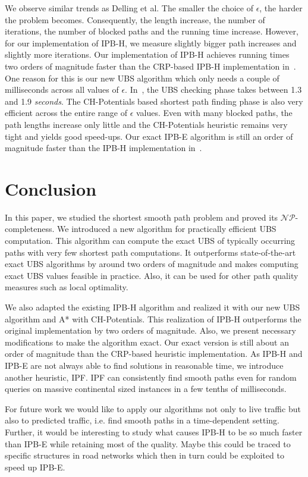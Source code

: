 \documentclass[a4paper,UKenglish,cleveref, autoref, thm-restate]{lipics-v2021}
\begin{document}
We observe similar trends as Delling et al.
The smaller the choice of $\epsilon$, the harder the problem becomes.
Consequently, the length increase, the number of iterations, the number of blocked paths and the running time increase.
However, for our implementation of IPB-H, we measure slightly bigger path increases and slightly more iterations.
Our implementation of IPB-H achieves running times two orders of magnitude faster than the CRP-based IPB-H implementation in~\cite{dss-tarrn-18}.
One reason for this is our new UBS algorithm which only needs a couple of milliseconds across all values of $\epsilon$.
In~\cite{dss-tarrn-18}, the UBS checking phase takes between 1.3 and 1.9 \emph{seconds}.
The CH-Potentials based shortest path finding phase is also very efficient across the entire range of $\epsilon$ values.
Even with many blocked paths, the path lengths increase only little and the CH-Potentials heuristic remains very tight and yields good speed-ups.
Our exact IPB-E algorithm is still an order of magnitude faster than the IPB-H implementation in~\cite{dss-tarrn-18}.

\section{Conclusion}

In this paper, we studied the shortest smooth path problem and proved its $\mathcal{NP}$-completeness.
We introduced a new algorithm for practically efficient UBS computation.
This algorithm can compute the exact UBS of typically occurring paths with very few shortest path computations.
It outperforms state-of-the-art exact UBS algorithms by around two orders of magnitude and makes computing exact UBS values feasible in practice.
Also, it can be used for other path quality measures such as local optimality.

We also adapted the existing IPB-H algorithm and realized it with our new UBS algorithm and A* with CH-Potentials.
This realization of IPB-H outperforms the original implementation by two orders of magnitude.
Also, we present necessary modifications to make the algorithm exact.
Our exact version is still about an order of magnitude than the CRP-based heuristic implementation.
As IPB-H and IPB-E are not always able to find solutions in reasonable time, we introduce another heuristic, IPF.
IPF can consistently find smooth paths even for random queries on massive continental sized instances in a few tenths of milliseconds.

For future work we would like to apply our algorithms not only to live traffic but also to predicted traffic, i.e. find smooth paths in a time-dependent setting.
Further, it would be interesting to study what causes IPB-H to be so much faster than IPB-E while retaining most of the quality.
Maybe this could be traced to specific structures in road networks which then in turn could be exploited to speed up IPB-E.
\end{document}
